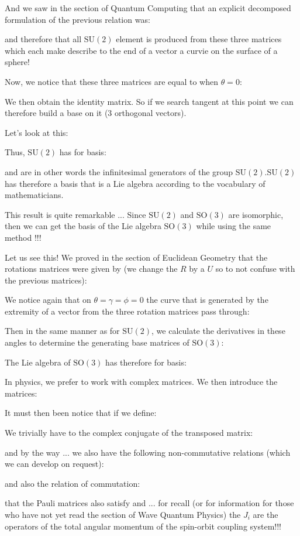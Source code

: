 	And we saw in the section of Quantum Computing that an explicit decomposed formulation of  the previous relation was:
	
	and therefore that all $\text{SU}(2)$ element is produced from these three matrices which each make describe to the end of a vector a curvie on the surface of a sphere!
	
	Now, we notice that these three matrices are equal to when $\theta=0$:
	
	We then obtain the identity matrix. So if we search tangent at this point we can therefore build a base on it ($3$ orthogonal vectors).
	
	Let's look at this:
	
	Thus, $\text{SU}(2)$ has for basis:
	
	and are in other words the infinitesimal generators of the group $\text{SU}(2)$.$\text{SU}(2)$ has therefore a basis that is a Lie algebra according to the vocabulary of mathematicians.
	
	This result is quite remarkable ... Since $\text{SU} (2)$ and $\text{SO} (3)$ are isomorphic, then we can get the basis of the Lie algebra $\text{SO} (3)$ while using the same method !!!
	
	Let us see this! We proved in the section of Euclidean Geometry that the rotations matrices were given by (we change the $R$ by a $U$ so to not confuse with the previous matrices):
	
	We notice again that on 
$\theta=\gamma=\phi=0$ the curve that is generated by the extremity of a vector from the three rotation matrices pass through:
	
	Then in the same manner as for $\text{SU} (2)$, we calculate the derivatives in these angles to determine the generating base matrices of $\text{SO} (3)$:
	
	The Lie algebra of $\text{SO} (3)$ has therefore for basis:
	
	In physics, we prefer to work with complex matrices. We then introduce the matrices:
	
	It must then been notice that if we define:
	
	We trivially have to the complex conjugate of the transposed matrix:
	
	and by the way ... we also have the following non-commutative relations (which we can develop on request):
	
	and also the relation of commutation:
	
	that the Pauli matrices also satisfy and ... for recall (or for information for those who have not yet read the section of Wave Quantum Physics) the $J_i$ are the operators of the total angular momentum of the spin-orbit coupling system!!!
	

